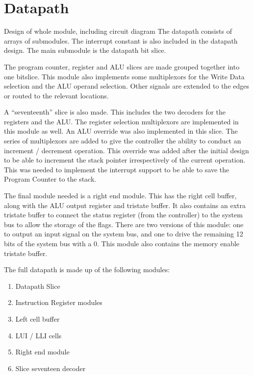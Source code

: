 

\section{Datapath}


Design of whole module, including circuit diagram
The datapath consists of arrays of submodules. 
The interrupt constant is also included in the datapath design.
The main submodule is the datapath bit slice. 

The program counter, register and ALU slices are made grouped together into one bitslice.
This module also implements some multiplexors for the Write Data selection and the ALU operand selection.
Other signals are extended to the edges or routed to the relevant locations. 

A ``seventeenth'' slice is also made. 
This includes the two decoders for the registers and the ALU.
The register selection multiplexors are implemented in this module as well.
An ALU override was also implemented in this slice.
The series of multiplexors are added to give the controller the ability to conduct an increment / decrement operation. 
This override was added after the initial design to be able to increment the stack pointer irrespectively of the current operation.
This was needed to implement the interrupt support to be able to save the Program Counter to the stack.

The final module needed is a right end module.
This has the right cell buffer, along with the ALU output register and tristate buffer.
It also contains an extra tristate buffer to connect the status register (from the controller) to the system bus to allow the storage of the flags.
There are two versions of this module: one to output an input signal on the system bus, and one to drive the remaining 12 bits of the system bus with a 0. 
This module also contains the memory enable tristate buffer.


The full datapath is made up of the following modules:
\begin{enumerate}
\item Datapath Slice
\item Instruction Register modules
\item Left cell buffer
\item LUI / LLI cells
\item Right end module
\item Slice seventeen decoder
\end{enumerate}

